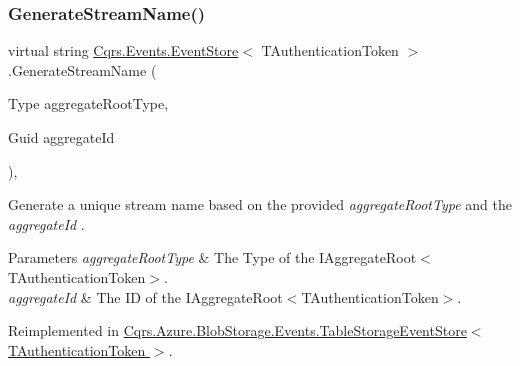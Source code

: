 \subsubsection{\texorpdfstring{Generate\+Stream\+Name()}{GenerateStreamName()}\hspace{0.1cm}{\footnotesize\ttfamily [2/2]}}
{\footnotesize\ttfamily virtual string \hyperlink{classCqrs_1_1Events_1_1EventStore}{Cqrs.\+Events.\+Event\+Store}$<$ T\+Authentication\+Token $>$.Generate\+Stream\+Name (\begin{DoxyParamCaption}\item[{Type}]{aggregate\+Root\+Type,  }\item[{Guid}]{aggregate\+Id }\end{DoxyParamCaption})\hspace{0.3cm}{\ttfamily [protected]}, {\ttfamily [virtual]}}



Generate a unique stream name based on the provided {\itshape aggregate\+Root\+Type}  and the {\itshape aggregate\+Id} . 


\begin{DoxyParams}{Parameters}
{\em aggregate\+Root\+Type} & The Type of the I\+Aggregate\+Root$<$\+T\+Authentication\+Token$>$.\\
\hline
{\em aggregate\+Id} & The ID of the I\+Aggregate\+Root$<$\+T\+Authentication\+Token$>$.\\
\hline
\end{DoxyParams}


Reimplemented in \hyperlink{classCqrs_1_1Azure_1_1BlobStorage_1_1Events_1_1TableStorageEventStore_a5cee1f388c1a03d9cfea5ee1a9f42657_a5cee1f388c1a03d9cfea5ee1a9f42657}{Cqrs.\+Azure.\+Blob\+Storage.\+Events.\+Table\+Storage\+Event\+Store$<$ T\+Authentication\+Token $>$}.

\mbox{\label{classCqrs_1_1Events_1_1EventStore_aa1d0d399a35c1e3b0759e27202695d8b_aa1d0d399a35c1e3b0759e27202695d8b}} 
